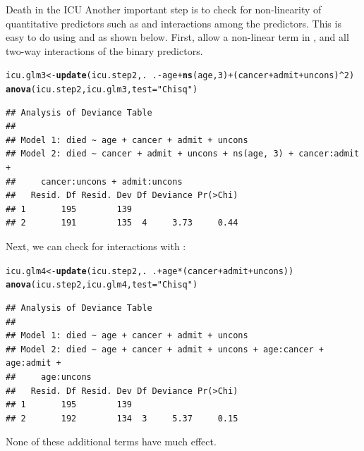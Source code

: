 \documentclass[11pt]{book}\usepackage[]{graphicx}\usepackage[]{color}
\makeatletter
\newcommand{\hlnum}[1]{\textcolor[rgb]{0.686,0.059,0.569}{#1}}%
\newcommand{\hlstr}[1]{\textcolor[rgb]{0.192,0.494,0.8}{#1}}%
\newcommand{\hlopt}[1]{\textcolor[rgb]{0,0,0}{#1}}%
\newcommand{\hlstd}[1]{\textcolor[rgb]{0.345,0.345,0.345}{#1}}%
\newcommand{\hlkwb}[1]{\textcolor[rgb]{0.69,0.353,0.396}{#1}}%
\newcommand{\hlkwc}[1]{\textcolor[rgb]{0.333,0.667,0.333}{#1}}%
\newcommand{\hlkwd}[1]{\textcolor[rgb]{0.737,0.353,0.396}{\textbf{#1}}}%
\newenvironment{kframe}{%
 \def\at@end@of@kframe{}%
 \ifinner\ifhmode%
  \def\at@end@of@kframe{\end{minipage}}%
  \begin{minipage}{\columnwidth}%
 \fi\fi%
 \def\FrameCommand##1{\hskip\@totalleftmargin \hskip-\fboxsep
 \colorbox{shadecolor}{##1}\hskip-\fboxsep
     \hskip-\linewidth \hskip-\@totalleftmargin \hskip\columnwidth}%
 \MakeFramed {\advance\hsize-\width
   \@totalleftmargin\z@ \linewidth\hsize
   \@setminipage}}%
 {\par\unskip\endMakeFramed%
 \at@end@of@kframe}
\newenvironment{knitrout}{}{} %
\renewenvironment{knitrout}{\small\renewcommand{\baselinestretch}{.85}}{} %
\makeatother
\begin{document}
\begin{Example}[icu1]{Death in the ICU}
Another important step is to check for non-linearity of quantitative predictors such
as  and interactions among the predictors.  This is easy to do using
 and  as shown below.  First, allow a non-linear term
in , and all two-way interactions of the binary predictors.
\begin{knitrout}
\color{fgcolor}\begin{kframe}
\begin{alltt}
\hlstd{icu.glm3} \hlkwb{<-} \hlkwd{update}\hlstd{(icu.step2, .} \hlopt{~} \hlstd{.} \hlopt{-}\hlstd{age} \hlopt{+} \hlkwd{ns}\hlstd{(age,}\hlnum{3}\hlstd{)} \hlopt{+} \hlstd{(cancer}\hlopt{+}\hlstd{admit}\hlopt{+}\hlstd{uncons)}\hlopt{^}\hlnum{2}\hlstd{)}
\hlkwd{anova}\hlstd{(icu.step2, icu.glm3,} \hlkwc{test}\hlstd{=}\hlstr{"Chisq"}\hlstd{)}
\end{alltt}
\begin{verbatim}
## Analysis of Deviance Table
## 
## Model 1: died ~ age + cancer + admit + uncons
## Model 2: died ~ cancer + admit + uncons + ns(age, 3) + cancer:admit + 
##     cancer:uncons + admit:uncons
##   Resid. Df Resid. Dev Df Deviance Pr(>Chi)
## 1       195        139                     
## 2       191        135  4     3.73     0.44
\end{verbatim}
\end{kframe}
\end{knitrout}
Next, we can check for interactions with :
\begin{knitrout}
\color{fgcolor}\begin{kframe}
\begin{alltt}
\hlstd{icu.glm4} \hlkwb{<-} \hlkwd{update}\hlstd{(icu.step2, .} \hlopt{~} \hlstd{.} \hlopt{+} \hlstd{age}\hlopt{*}\hlstd{(cancer}\hlopt{+}\hlstd{admit}\hlopt{+}\hlstd{uncons))}
\hlkwd{anova}\hlstd{(icu.step2, icu.glm4,} \hlkwc{test}\hlstd{=}\hlstr{"Chisq"}\hlstd{)}
\end{alltt}
\begin{verbatim}
## Analysis of Deviance Table
## 
## Model 1: died ~ age + cancer + admit + uncons
## Model 2: died ~ age + cancer + admit + uncons + age:cancer + age:admit + 
##     age:uncons
##   Resid. Df Resid. Dev Df Deviance Pr(>Chi)
## 1       195        139                     
## 2       192        134  3     5.37     0.15
\end{verbatim}
\end{kframe}
\end{knitrout}
\noindent None of these additional terms have much effect.


\end{Example}
\end{document}
